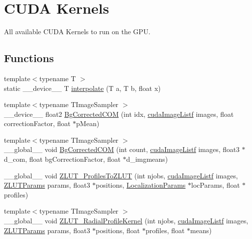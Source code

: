 \hypertarget{group__kernels}{}\section{C\+U\+DA Kernels}
\label{group__kernels}


All available C\+U\+DA Kernels to run on the G\+PU.  


\subsection*{Functions}
\begin{DoxyCompactItemize}
\item 
{\footnotesize template$<$typename T $>$ }\\static \+\_\+\+\_\+device\+\_\+\+\_\+ T \hyperlink{group__kernels_ga20d3b4d870a90595bb01e1429c5541f0}{interpolate} (T a, T b, float x)
\item 
{\footnotesize template$<$typename T\+Image\+Sampler $>$ }\\\+\_\+\+\_\+device\+\_\+\+\_\+ float2 \hyperlink{group__kernels_gab68fb94c047f06d1244bdb99b82434b3}{Bg\+Corrected\+C\+OM} (int idx, \hyperlink{_queued_c_u_d_a_tracker_8h_a84de79f5d4b6e4c8d5622fe712c1bd69}{cuda\+Image\+Listf} images, float correction\+Factor, float $\ast$p\+Mean)
\item 
{\footnotesize template$<$typename T\+Image\+Sampler $>$ }\\\+\_\+\+\_\+global\+\_\+\+\_\+ void \hyperlink{group__kernels_gaadfa5148ca9461daab04dbf9e0394791}{Bg\+Corrected\+C\+OM} (int count, \hyperlink{_queued_c_u_d_a_tracker_8h_a84de79f5d4b6e4c8d5622fe712c1bd69}{cuda\+Image\+Listf} images, float3 $\ast$d\+\_\+com, float bg\+Correction\+Factor, float $\ast$d\+\_\+imgmeans)
\item 
\+\_\+\+\_\+global\+\_\+\+\_\+ void \hyperlink{group__kernels_ga9b32b8197dc8895328e9850cafa295c3}{Z\+L\+U\+T\+\_\+\+Profiles\+To\+Z\+L\+UT} (int njobs, \hyperlink{_queued_c_u_d_a_tracker_8h_a84de79f5d4b6e4c8d5622fe712c1bd69}{cuda\+Image\+Listf} images, \hyperlink{struct_z_l_u_t_params}{Z\+L\+U\+T\+Params} params, float3 $\ast$positions, \hyperlink{struct_localization_params}{Localization\+Params} $\ast$loc\+Params, float $\ast$profiles)
\item 
{\footnotesize template$<$typename T\+Image\+Sampler $>$ }\\\+\_\+\+\_\+global\+\_\+\+\_\+ void \hyperlink{group__kernels_gadf9148f47982d2685fa156a957fc21c2}{Z\+L\+U\+T\+\_\+\+Radial\+Profile\+Kernel} (int njobs, \hyperlink{_queued_c_u_d_a_tracker_8h_a84de79f5d4b6e4c8d5622fe712c1bd69}{cuda\+Image\+Listf} images, \hyperlink{struct_z_l_u_t_params}{Z\+L\+U\+T\+Params} params, float3 $\ast$positions, float $\ast$profiles, float $\ast$means)

\end{DoxyCompactItemize}
